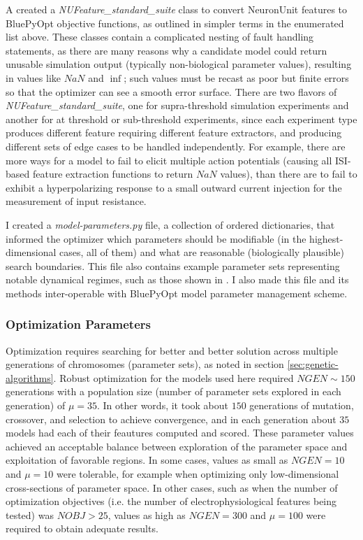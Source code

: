 A created a \emph{NUFeature\_standard\_suite} class to convert NeuronUnit features to BluePyOpt objective functions, as outlined in simpler terms in the enumerated list above.
These classes contain a complicated nesting of fault handling statements, as there are many reasons why a candidate model could return unusable simulation output (typically non-biological parameter values), resulting in values like $NaN$ and $\inf$; such values must be recast as poor but finite errors so that the optimizer can see a smooth error surface.
There are two flavors of \emph{NUFeature\_standard\_suite}, one for supra-threshold simulation experiments and another for at threshold or sub-threshold experiments, since each experiment type produces different feature requiring different feature extractors, and producing different sets of edge cases to be handled independently.
For example, there are more ways for a model to fail to elicit multiple action potentials (causing all ISI-based feature extraction functions to return $NaN$ values), than there are to fail to exhibit a hyperpolarizing response to a small outward current injection for the measurement of input resistance.
 
I created a \emph{model-parameters.py} file, a collection of ordered dictionaries, that informed the optimizer which parameters should be modifiable (in the highest-dimensional cases, all of them) and what are reasonable (biologically plausible) search boundaries.
This file also contains example parameter sets representing notable dynamical regimes, such as those shown in \cite{izhikevich2003simple}.
I also made this file and its methods inter-operable with BluePyOpt model parameter management scheme.

\subsubsection{Optimization Parameters}
Optimization requires searching for better and better solution across multiple generations of chromosomes (parameter sets), as noted in section \ref{sec:genetic-algorithms}.
Robust optimization for the models used here required $NGEN\sim150$ generations with a population size (number of parameter sets explored in each generation) of $\mu=35$.
In other words, it took about $150$ generations of mutation, crossover, and selection to achieve convergence, and in each generation about $35$ models had each of their feautures computed and scored.
These parameter values achieved an acceptable balance between exploration of the parameter space and exploitation of favorable regions.
In some cases, values as small as $NGEN=10$ and $\mu=10$ were tolerable, for example when optimizing only low-dimensional cross-sections of parameter space.
In other cases, such as when the number of optimization objectives (i.e. the number of electrophysiological features being tested) was $NOBJ>25$, values as high as $NGEN=300$ and $\mu=100$ were required to obtain adequate results.


